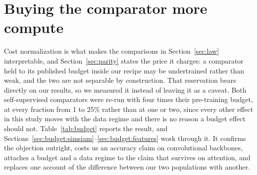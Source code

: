 \section{Buying the comparator more compute}\label{sec:budget}

Cost normalization is what makes the comparisons in
Section~\ref{sec:law} interpretable, and Section~\ref{sec:parity} states
the price it charges: a comparator held to its published budget inside our
recipe may be undertrained rather than weak, and the two are not separable
by construction. That reservation bears directly on our results, so we
measured it instead of leaving it as a caveat. Both self-supervised
comparators were re-run with four times their pre-training budget, at every
fraction from 1 to 25\% rather than at one or two, since every other effect
in this study moves with the data regime and there is no reason a budget
effect should not. Table~\ref{tab:budget} reports the result, and
Sections~\ref{sec:budget:simsiam}--\ref{sec:budget:features} work through
it. It confirms the objection outright, costs us an accuracy claim on
convolutional backbones, attaches a budget and a data regime to the claim
that survives on attention, and replaces one account of the difference
between our two populations with another.

